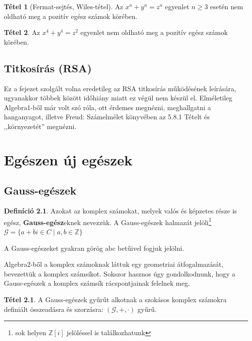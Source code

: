 \documentclass[12pt]{book}
\theoremstyle{plain} %
\theoremstyle{definition} %
\newtheorem{defi/}{Definíció}[section]
\newenvironment{defi}
  {\renewcommand{\qedsymbol}{$\clubsuit$}%
   \pushQED{\qed}\begin{defi/}}
  {\popQED\end{defi/}}
\newtheorem{theo/}{Tétel}[section]
\newenvironment{theo}
  {\renewcommand{\qedsymbol}{$\clubsuit$}%
   \pushQED{\qed}\begin{theo/}}
  {\popQED\end{theo/}}
\theoremstyle{remark}
\renewcommand\qedsymbol{$\blacksquare$}
\numberwithin{equation}{section}  %
\def\Z{\mathbb{Z}}
\begin{document}
	\begin{theo}[Fermat-sejtés, Wiles-tétel]
		Az $x^n+y^n=z^n$ egyenlet $n\geq3$ esetén nem oldható meg a pozitív egész számok körében.
	\end{theo}

	\begin{theo}
		Az $x^4+y^4=z^2$ egyenlet nem oldható meg a pozitív egész számok körében.
	\end{theo}
	
	\section{Titkosírás (RSA)}
	
	Ez a fejezet szolgált volna eredetileg az RSA titkosírás működésének leírására, ugyanakkor többek között időhiány miatt ez végül nem készül el. Elméletileg Algebra1-ből már volt szó róla, ott érdemes megnézni, meghallgatni a hanganyagot, illetve Freud: Számelmélet könyvében az 5.8.1 Tételt és ,,környezetét'' megnézni.
	
	\chapter{Egészen új egészek}
	\section{Gauss-egészek}
	
	\begin{defi}
		Azokat az komplex számokat, melyek valós és képzetes része is egész, \textbf{Gauss-egész}eknek nevezzük. A Gauss-egészek halmazát jelöli\footnote{sok helyen $\Z[i]$ jelöléssel is találkozhatunk} $\mathcal{G}=\{ a+bi\in C \mid a,b\in \Z  \}$
	\end{defi}

	A Gauss-egészeket gyakran görög abc betűivel fogjuk jelölni.
	
	Algebra2-ből a komplex számoknak láttuk egy geometriai átfogalmazását, bevezettük a komplex számsíkot. Sokszor hasznos úgy gondolkodnunk, hogy a Gauss-egészek a komplex számsík rácspontjainak felelnek meg.

	\begin{theo}
		A Gauss-egészek gyűrűt alkotnak a szokásos komplex számokra definiált összeadásra és szorzásra: $(\mathcal{G},+,\cdot)$ gyűrű.
	\end{theo}
\end{document}
